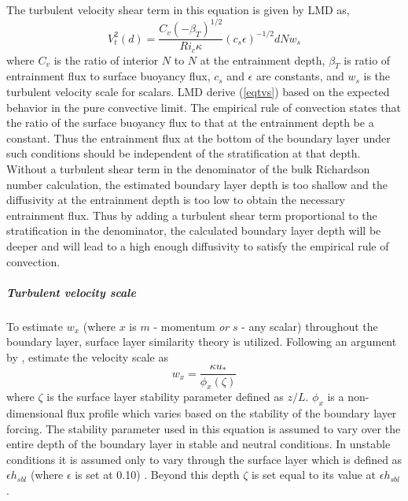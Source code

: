 The turbulent velocity shear term in this equation is given by LMD as,
\begin{equation}
  V_{t}^{2}(d)=\frac{C_v(-\beta_T)^{1/2}}{Ri_c
  \kappa}(c_s\epsilon)^{-1/2}dNw_s
  \label{eqtvs}
\end{equation}
where $C_v$ is the ratio of interior $N$ to $N$ at the entrainment
depth, $\beta_T$ is ratio of entrainment flux to surface buoyancy flux,
$c_s$ and $\epsilon$ are constants, and $w_s$ is the turbulent velocity
scale for scalars.
LMD derive (\ref{eqtvs}) based on the expected behavior in the pure
convective limit.  The empirical rule of convection states that the
ratio of the surface buoyancy flux to that at the entrainment depth be 
a constant.  Thus the entrainment flux at the
bottom of the boundary layer under such conditions should be
independent of the stratification at that depth.  Without a turbulent
shear term in the denominator of the bulk Richardson number
calculation, the estimated boundary layer depth is too shallow and the
diffusivity at the entrainment depth is too low to obtain the
necessary entrainment flux.  Thus by adding a turbulent shear term
proportional to the stratification in the denominator, the calculated
boundary layer depth will be deeper and will lead to a high enough
diffusivity to satisfy the empirical rule of convection.
  
\subparagraph{Turbulent velocity scale}
To estimate $w_x$ (where $x$ is $m$ - momentum {\em or} $s$
- any scalar) throughout the boundary layer, surface layer similarity
theory is utilized.  Following an argument by
\citet{TM86}, \citet{Large94} estimate the velocity scale as
\begin{equation}
w_x=\frac{\kappa u_*}{\phi_x(\zeta)}
\end{equation}
where $\zeta$ is the surface layer stability parameter defined as
$z/L$.  $\phi_x$ is a non-dimensional flux profile which varies based
on the stability of the boundary layer forcing.  The stability
parameter used in this equation is assumed to vary over the entire
depth of the boundary layer in stable and neutral conditions.  In
unstable conditions it is assumed only to vary through the surface
layer which is defined as $ \epsilon h_{sbl} $ (where $\epsilon$ is
set at 0.10) .  Beyond this depth $\zeta$
is set equal to its value at $ \epsilon h_{sbl} $.

